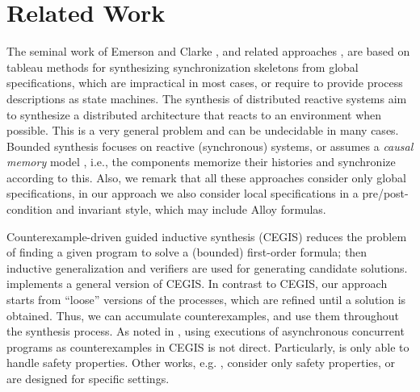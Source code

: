 \section{Related Work}\label{sec:related}	

The seminal work of Emerson and Clarke \cite{EmersonClarke82}, and related approaches \cite{Attie16,EmersonSamanta11}, are based on tableau methods for synthesizing synchronization skeletons from global {\CTL} specifications,  which are impractical in most cases, or require to provide process descriptions as state machines.
The synthesis of distributed reactive systems \cite{PnueliRosner90}  aim to synthesize a distributed architecture that reacts to an environment when possible. This is a very general problem and can be undecidable in many cases.  Bounded synthesis \cite{DBLP:journals/sttt/FinkbeinerS13} focuses on reactive (synchronous) systems,
or assumes a \emph{causal memory}  model \cite{DBLP:journals/iandc/FinkbeinerO17},  i.e.,  the components memorize their histories and synchronize according to this.  Also, we remark that all these approaches consider only global {\LTL} specifications,  in our approach we also consider local specifications in a pre/post-condition and invariant style, which may include Alloy formulas.

Counterexample-driven guided inductive synthesis (CEGIS) \cite{Abate+2018} reduces the problem of finding a given program to solve a (bounded) first-order formula; then inductive generalization and verifiers are used for generating candidate solutions. {\AlloyStar}  \cite{Milicevic+2015} implements a general version of CEGIS. In contrast to CEGIS, our approach starts from ``loose'' versions of the processes, which are refined until a solution is obtained. Thus, we can accumulate counterexamples, and use them throughout the synthesis process.  As noted in \cite{Solar-Lezama+2008},  
using executions of asynchronous concurrent programs as counterexamples in  CEGIS is not direct.  Particularly, {\Sketch} is only able to handle safety properties.  Other works, e.g. \cite{VechevYY13,Party}, consider only safety properties, or are designed for specific settings.



